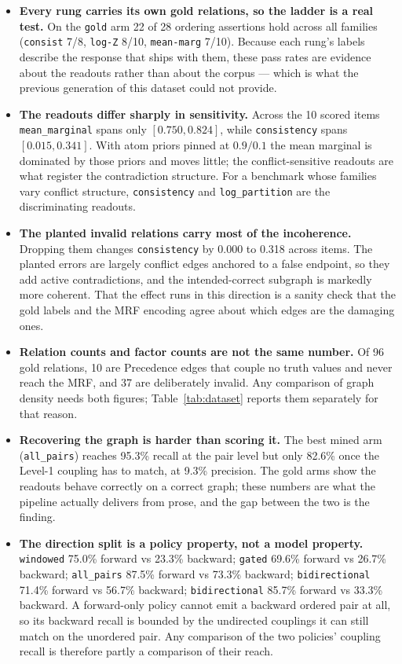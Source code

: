 \documentclass[11pt]{article}
\begin{document}
\begin{itemize}
\item \textbf{Every rung carries its own gold relations, so the ladder is a real test.} On the \texttt{gold} arm 22 of 28 ordering assertions hold across all families (\texttt{consist} 7/8, \texttt{log-Z} 8/10, \texttt{mean-marg} 7/10). Because each rung's labels describe the response that ships with them, these pass rates are evidence about the readouts rather than about the corpus --- which is what the previous generation of this dataset could not provide.
\item \textbf{The readouts differ sharply in sensitivity.} Across the 10 scored items \texttt{mean\_marginal} spans only $[0.750, 0.824]$, while \texttt{consistency} spans $[0.015, 0.341]$. With atom priors pinned at $0.9/0.1$ the mean marginal is dominated by those priors and moves little; the conflict-sensitive readouts are what register the contradiction structure. For a benchmark whose families vary conflict structure, \texttt{consistency} and \texttt{log\_partition} are the discriminating readouts.
\item \textbf{The planted invalid relations carry most of the incoherence.} Dropping them changes \texttt{consistency} by 0.000 to 0.318 across items. The planted errors are largely conflict edges anchored to a false endpoint, so they add active contradictions, and the intended-correct subgraph is markedly more coherent. That the effect runs in this direction is a sanity check that the gold labels and the MRF encoding agree about which edges are the damaging ones.
\item \textbf{Relation counts and factor counts are not the same number.} Of 96 gold relations, 10 are Precedence edges that couple no truth values and never reach the MRF, and 37 are deliberately invalid. Any comparison of graph density needs both figures; Table~\ref{tab:dataset} reports them separately for that reason.
\item \textbf{Recovering the graph is harder than scoring it.} The best mined arm (\texttt{all\_pairs}) reaches 95.3\% recall at the pair level but only 82.6\% once the Level-1 coupling has to match, at 9.3\% precision. The gold arms show the readouts behave correctly on a correct graph; these numbers are what the pipeline actually delivers from prose, and the gap between the two is the finding.
\item \textbf{The direction split is a policy property, not a model property.} \texttt{windowed} 75.0\% forward vs 23.3\% backward; \texttt{gated} 69.6\% forward vs 26.7\% backward; \texttt{all\_pairs} 87.5\% forward vs 73.3\% backward; \texttt{bidirectional} 71.4\% forward vs 56.7\% backward; \texttt{bidirectional} 85.7\% forward vs 33.3\% backward. A forward-only policy cannot emit a backward ordered pair at all, so its backward recall is bounded by the undirected couplings it can still match on the unordered pair. Any comparison of the two policies' coupling recall is therefore partly a comparison of their reach.

\end{itemize}
\end{document}
